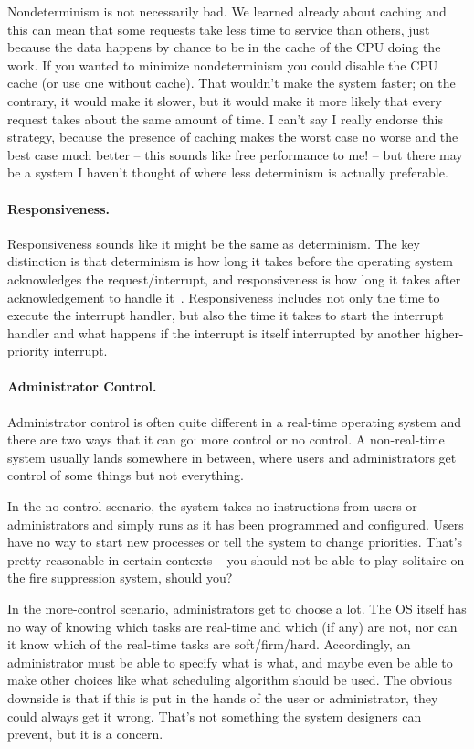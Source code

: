 Nondeterminism is not necessarily bad. We learned already about caching and this can mean that some requests take less time to service than others, just because the data happens by chance to be in the cache of the CPU doing the work. If you wanted to minimize nondeterminism you could disable the CPU cache (or use one without cache). That wouldn't make the system faster; on the contrary, it would make it slower, but it would make it more likely that every request takes about the same amount of time. I can't say I really endorse this strategy, because the presence of caching makes the worst case no worse and the best case much better -- this sounds like free performance to me! -- but there may be a system I haven't thought of where less determinism is actually preferable.

\paragraph{Responsiveness.} Responsiveness sounds like it might be the same as determinism. The key distinction is that determinism is how long it takes before the operating system acknowledges the request/interrupt, and responsiveness is how long it takes after acknowledgement to handle it~\cite{osi}. Responsiveness includes not only the time to execute the interrupt handler, but also the time it takes to start the interrupt handler and what happens if the interrupt is itself interrupted by another higher-priority interrupt.

\paragraph{Administrator Control.} Administrator control is often quite different in a real-time operating system and there are two ways that it can go: more control or no control. A non-real-time system usually lands somewhere in between, where users and administrators get control of some things but not everything.

In the no-control scenario, the system takes no instructions from users or administrators and simply runs as it has been programmed and configured. Users have no way to start new processes or tell the system to change priorities. That's pretty reasonable in certain contexts -- you should not be able to play solitaire on the fire suppression system, should you?

In the more-control scenario, administrators get to choose a lot. The OS itself has no way of knowing which tasks are real-time and which (if any) are not, nor can it know which of the real-time tasks are soft/firm/hard. Accordingly, an administrator must be able to specify what is what, and maybe even be able to make other choices like what scheduling algorithm should be used. The obvious downside is that if this is put in the hands of the user or administrator, they could always get it wrong. That's not something the system designers can prevent, but it is a concern.

